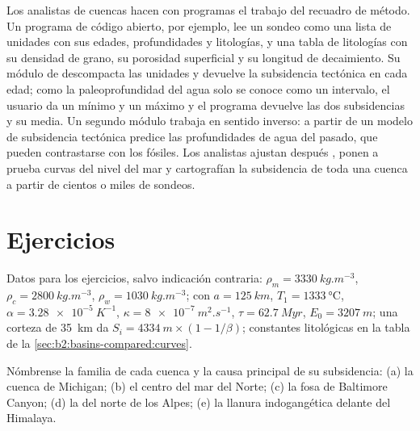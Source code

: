 \begin{inthelab}
Los analistas de cuencas hacen con programas el trabajo del recuadro de método. Un programa de código abierto, por
ejemplo, lee un sondeo como una lista de unidades con sus edades, profundidades y litologías, y una
tabla de litologías con su densidad de grano, su porosidad superficial y su longitud de decaimiento. Su
módulo de  descompacta las unidades y devuelve la subsidencia tectónica en cada edad;
como la paleoprofundidad del agua solo se conoce como un intervalo, el usuario da un mínimo y un máximo y
el programa devuelve las dos subsidencias y su media. Un segundo módulo trabaja en sentido inverso:
a partir de un modelo de subsidencia tectónica predice las profundidades de agua del pasado, que pueden
contrastarse con los fósiles. Los analistas ajustan después , ponen a prueba curvas del nivel del mar y
cartografían la subsidencia de toda una cuenca a partir de cientos o miles de sondeos.
\end{inthelab}

\section*{Ejercicios}\label{sec:b2:basins-compared:exercises}

Datos para los ejercicios, salvo indicación contraria: $\rho_m = \qty{3330}{kg.m^{-3}}$, $\rho_c =
\qty{2800}{kg.m^{-3}}$, $\rho_w = \qty{1030}{kg.m^{-3}}$;  con $a =
\qty{125}{km}$, $T_1 = \qty{1333}{\celsius}$, $\alpha = \qty{3.28e-5}{K^{-1}}$, $\kappa =
\qty{8e-7}{m^2.s^{-1}}$, $\tau = \qty{62.7}{Myr}$, $E_0 = \qty{3207}{m}$; una corteza de \qty{35}{km}
da $S_i = \qty{4334}{m}\times(1 - 1/\beta)$; constantes litológicas en la tabla de la
\cref{sec:b2:basins-compared:curves}.

\begin{exercise}[$\star$]\label{exo:b2:basins-compared:1}
Nómbrense la familia de cada cuenca y la causa principal de su subsidencia: (a) la cuenca de Michigan;
(b) el centro del mar del Norte; (c) la fosa de Baltimore Canyon; (d) la  del norte de los Alpes;
(e) la llanura indogangética delante del Himalaya.
\end{exercise}

